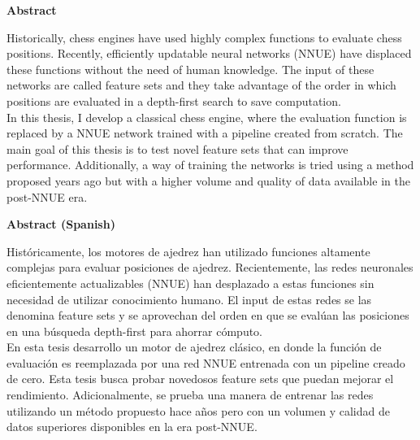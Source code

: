 \thispagestyle{plain}
\begin{center}
\large
\textbf{Abstract}
\end{center}

\begin{center}
\parbox{15cm}{
Historically, chess engines have used highly complex functions to evaluate chess positions. Recently, efficiently updatable neural networks (NNUE) have displaced these functions without the need of human knowledge. The input of these networks are called feature sets and they take advantage of the order in which positions are evaluated in a depth-first search to save computation. \\

In this thesis, I develop a classical chess engine, where the evaluation function is replaced by a NNUE network trained with a pipeline created from scratch. The main goal of this thesis is to test novel feature sets that can improve performance. Additionally, a way of training the networks is tried using a method proposed years ago but with a higher volume and quality of data available in the post-NNUE era.
}
\end{center}

\vspace{1cm}

\begin{center}
\large
\textbf{Abstract (Spanish)}
\end{center}

\begin{center}
\parbox{15cm}{
Históricamente, los motores de ajedrez han utilizado funciones altamente complejas para evaluar posiciones de ajedrez. Recientemente, las redes neuronales eficientemente actualizables (NNUE) han desplazado a estas funciones sin necesidad de utilizar conocimiento humano. El input de estas redes se las denomina feature sets y se aprovechan del orden en que se evalúan las posiciones en una búsqueda depth-first para ahorrar cómputo. \\

En esta tesis desarrollo un motor de ajedrez clásico, en donde la función de evaluación es reemplazada por una red NNUE entrenada con un pipeline creado de cero. Esta tesis busca probar novedosos feature sets que puedan mejorar el rendimiento. Adicionalmente, se prueba una manera de entrenar las redes utilizando un método propuesto hace años pero con un volumen y calidad de datos superiores disponibles en la era post-NNUE.
}
\end{center}

\clearpage
